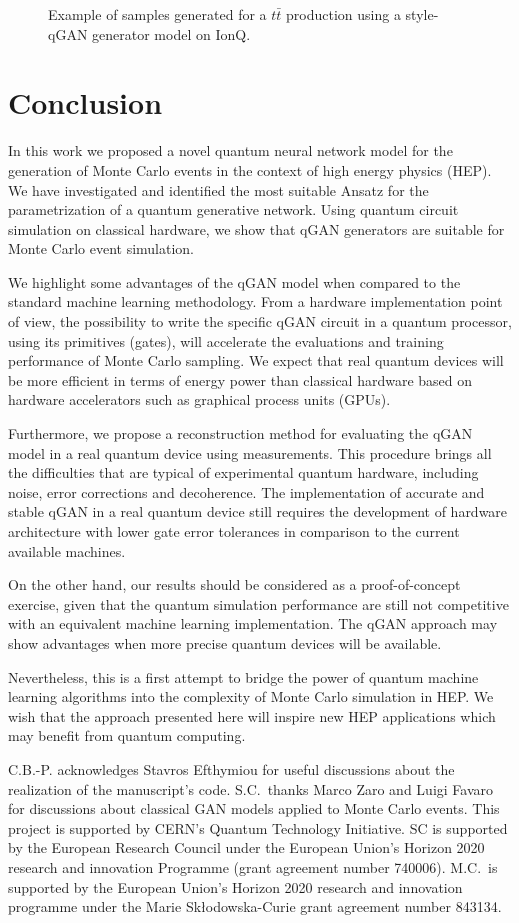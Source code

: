 \documentclass[twocolumn,preprintnumbers,superscriptaddress]{revtex4-2}
\begin{document}
\begin{figure}
  \caption{\label{fig:ionq}Example of samples generated for a $t\bar{t}$
    production using a style-qGAN generator model on IonQ.}
\end{figure}


\section{Conclusion}
\label{sec:conclusion}

In this work we proposed a novel quantum neural network model for the generation
of Monte Carlo events in the context of high energy physics (HEP). We have
investigated and identified the most suitable Ansatz for the parametrization of
a quantum generative network. Using quantum circuit simulation on classical
hardware, we show that qGAN generators are suitable for Monte Carlo event
simulation.

We highlight some advantages of the qGAN model when compared to the standard
machine learning methodology. From a hardware implementation point of view, the
possibility to write the specific qGAN circuit in a quantum processor, using its
primitives (gates), will accelerate the evaluations and training performance of
Monte Carlo sampling. We expect that real quantum devices will be more efficient
in terms of energy power than classical hardware based on hardware accelerators
such as graphical process units (GPUs).

Furthermore, we propose a reconstruction method for evaluating the qGAN model in
a real quantum device using measurements. This procedure brings all the
difficulties that are typical of experimental quantum hardware, including noise,
error corrections and decoherence. The implementation of accurate and stable
qGAN in a real quantum device still requires the development of hardware
architecture with lower gate error tolerances in comparison to the current
available machines.

On the other hand, our results should be considered as a proof-of-concept
exercise, given that the quantum simulation performance are still not
competitive with an equivalent machine learning implementation. The qGAN
approach may show advantages when more precise quantum devices will be
available.

Nevertheless, this is a first attempt to bridge the power of quantum machine
learning algorithms into the complexity of Monte Carlo simulation in HEP. We
wish that the approach presented here will inspire new HEP applications which
may benefit from quantum computing.

\acknowledgments

C.B.-P. acknowledges Stavros Efthymiou for useful discussions about the
realization of the manuscript's code. S.C.~thanks Marco Zaro and Luigi Favaro for
discussions about classical GAN models applied to Monte Carlo events. This
project is supported by CERN's Quantum Technology Initiative. SC is supported by the European Research
Council under the European Union's Horizon 2020 research and innovation
Programme (grant agreement number 740006).
M.C.\ is supported by the European Union’s Horizon 2020 research and innovation programme under the Marie Skłodowska-Curie grant agreement number 843134.


\end{document}
